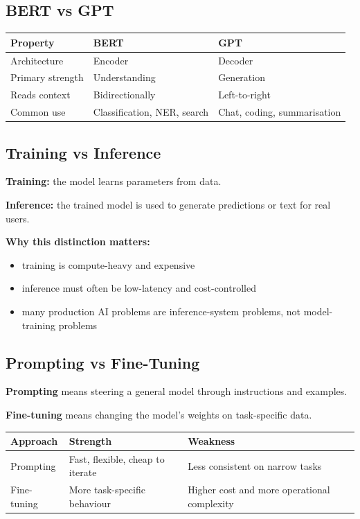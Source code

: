 \documentclass[12pt, a4paper, oneside]{book}
\begin{document}
\subsection{BERT vs GPT}

\begin{center}
\begin{tabular}{l l l}
\toprule
\textbf{Property} & \textbf{BERT} & \textbf{GPT} \\
\midrule
Architecture & Encoder & Decoder \\
Primary strength & Understanding & Generation \\
Reads context & Bidirectionally & Left-to-right \\
Common use & Classification, NER, search & Chat, coding, summarisation \\
\bottomrule
\end{tabular}
\end{center}

\subsection{Training vs Inference}

\textbf{Training:} the model learns parameters from data.

\textbf{Inference:} the trained model is used to generate predictions or text for real users.

\textbf{Why this distinction matters:}
\begin{itemize}[leftmargin=2em]
    \item training is compute-heavy and expensive
    \item inference must often be low-latency and cost-controlled
    \item many production AI problems are inference-system problems, not model-training problems
\end{itemize}

\subsection{Prompting vs Fine-Tuning}

\textbf{Prompting} means steering a general model through instructions and examples.

\textbf{Fine-tuning} means changing the model's weights on task-specific data.

\begin{center}
\begin{tabular}{l l l}
\toprule
\textbf{Approach} & \textbf{Strength} & \textbf{Weakness} \\
\midrule
Prompting & Fast, flexible, cheap to iterate & Less consistent on narrow tasks \\
Fine-tuning & More task-specific behaviour & Higher cost and more operational complexity \\
\bottomrule
\end{tabular}
\end{center}
\end{document}
